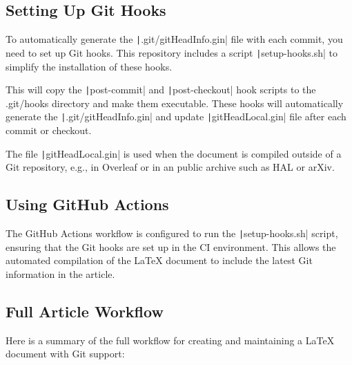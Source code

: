 \documentclass[a4paper]{article}
\begin{document}
\subsection{Setting Up Git Hooks}

To automatically generate the \texttt|.git/gitHeadInfo.gin| file with each commit, you need to set up Git hooks. 
This repository includes a script \texttt|setup-hooks.sh| to simplify the installation of these hooks.

This will copy the \texttt|post-commit| and \texttt|post-checkout| hook scripts to the .git/hooks directory and make them executable. 
These hooks will automatically generate the \texttt|.git/gitHeadInfo.gin| and update \texttt|gitHeadLocal.gin| file after each commit or checkout.

The file \texttt|gitHeadLocal.gin| is used when the document is compiled outside of a Git repository, e.g., in Overleaf or in an public archive such as HAL or arXiv.


\subsection{Using GitHub Actions}

The GitHub Actions workflow is configured to run the \texttt|setup-hooks.sh| script, ensuring that the Git hooks are set up in the CI environment.
This allows the automated compilation of the LaTeX document to include the latest Git information in the article.

\subsection{Full Article Workflow}

Here is a summary of the full workflow for creating and maintaining a LaTeX document with Git support:
\end{document}
